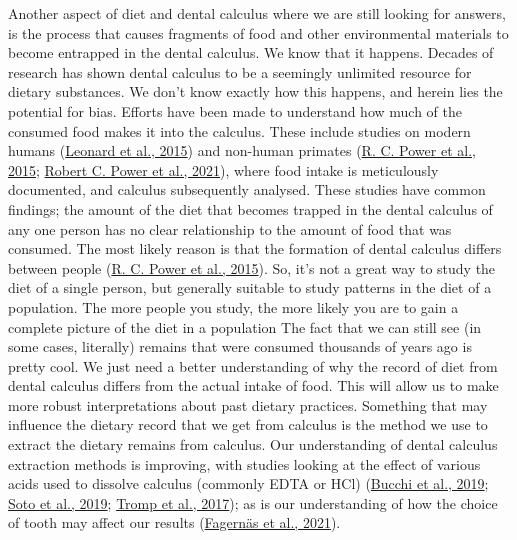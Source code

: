 \documentclass[
  letterpaper,
]{book}
\begin{document}
Another aspect of diet and dental calculus where we are still looking
for answers, is the process that causes fragments of food and other
environmental materials to become entrapped in the dental calculus. We
know that it happens. Decades of research has shown dental calculus to
be a seemingly unlimited resource for dietary substances. We don't know
exactly how this happens, and herein lies the potential for bias.
Efforts have been made to understand how much of the consumed food makes
it into the calculus. These include studies on modern humans
(\protect\hyperlink{ref-leonardPlantMicroremains2015}{Leonard et al.,
2015}) and non-human primates
(\protect\hyperlink{ref-powerChimpCalculus2015}{R. C. Power et al.,
2015}; \protect\hyperlink{ref-powerRepresentativenessDental2021}{Robert
C. Power et al., 2021}), where food intake is meticulously documented,
and calculus subsequently analysed. These studies have common findings;
the amount of the diet that becomes trapped in the dental calculus of
any one person has no clear relationship to the amount of food that was
consumed. The most likely reason is that the formation of dental
calculus differs between people
(\protect\hyperlink{ref-powerChimpCalculus2015}{R. C. Power et al.,
2015}). So, it's not a great way to study the diet of a single person,
but generally suitable to study patterns in the diet of a population.
The more people you study, the more likely you are to gain a complete
picture of the diet in a population The fact that we can still see (in
some cases, literally) remains that were consumed thousands of years ago
is pretty cool. We just need a better understanding of why the record of
diet from dental calculus differs from the actual intake of food. This
will allow us to make more robust interpretations about past dietary
practices. Something that may influence the dietary record that we get
from calculus is the method we use to extract the dietary remains from
calculus. Our understanding of dental calculus extraction methods is
improving, with studies looking at the effect of various acids used to
dissolve calculus (commonly EDTA or HCl)
(\protect\hyperlink{ref-bucchiComparisonsMethods2019}{Bucchi et al.,
2019};
\protect\hyperlink{ref-sotoCharacterizationDecontamination2019}{Soto et
al., 2019}; \protect\hyperlink{ref-trompEDTACalculus2017}{Tromp et al.,
2017}); as is our understanding of how the choice of tooth may affect
our results
(\protect\hyperlink{ref-fagernasMicrobialBiogeography2021}{Fagernäs et
al., 2021}).
\end{document}
